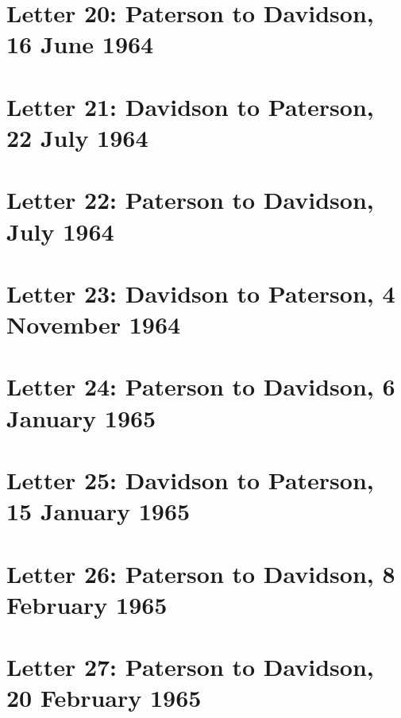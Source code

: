\documentclass[a4paper,11pt,abstracton,hidelinks]{scrartcl}
\begin{document}
\section{Letter 20: Paterson to Davidson, 16 June 1964}


\section{Letter 21: Davidson to Paterson, 22 July 1964}


\section{Letter 22: Paterson to Davidson, July 1964}


\section{Letter 23: Davidson to Paterson, 4 November 1964}


\section{Letter 24: Paterson to Davidson, 6 January 1965}


\section{Letter 25: Davidson to Paterson, 15 January 1965}


\section{Letter 26: Paterson to Davidson, 8 February 1965}


\section{Letter 27: Paterson to Davidson, 20 February 1965}

\end{document}
